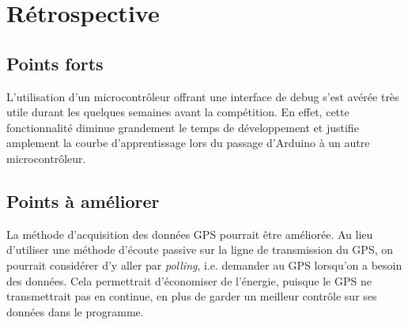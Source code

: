 \section{Rétrospective}

\subsection{Points forts}

L'utilisation d'un microcontrôleur offrant une interface de debug s'est avérée
très utile durant les quelques semaines avant la compétition. En effet, cette
fonctionnalité diminue grandement le temps de développement et justifie
amplement la courbe d'apprentissage lors du passage d'Arduino à un autre
microcontrôleur.
\par


\subsection{Points à améliorer}

La méthode d'acquisition des données GPS pourrait être améliorée. Au lieu
d'utiliser une méthode d'écoute passive sur la ligne de transmission du GPS, on
pourrait considérer d'y aller par \textit{polling}, i.e. demander au GPS
lorsqu'on a besoin des données. Cela permettrait d'économiser de l'énergie,
puisque le GPS ne transmettrait pas en continue, en plus de garder un meilleur
contrôle sur ses données dans le programme.
